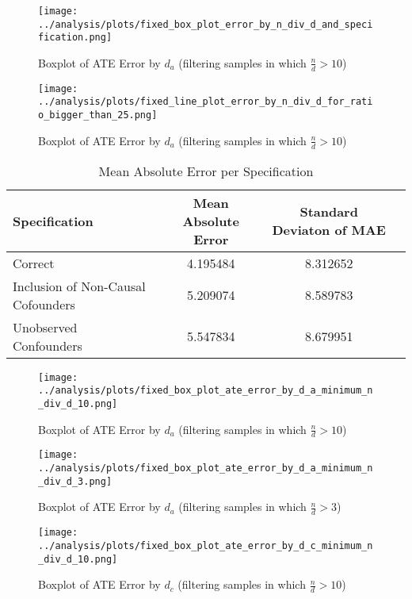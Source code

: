 \documentclass{article}
\numberwithin{equation}{section}
\begin{document}
\begin{figure}[H]
    \centering
    \texttt{[image: ../analysis/plots/fixed\_box\_plot\_error\_by\_n\_div\_d\_and\_specification.png]}
    \caption{Boxplot of ATE Error by $d_a$ (filtering samples in which $\frac{n}{d} > 10$)}
\end{figure}

\begin{figure}[H]
    \centering
    \texttt{[image: ../analysis/plots/fixed\_line\_plot\_error\_by\_n\_div\_d\_for\_ratio\_bigger\_than\_25.png]}
    \caption{Boxplot of ATE Error by $d_a$ (filtering samples in which $\frac{n}{d} > 10$)}
\end{figure}

\begin{table}[H]
    \centering
    \begin{tabular}{lccc}
        \toprule
        Specification & Mean Absolute Error & Standard Deviaton of MAE \\
        \midrule
        Correct & 4.195484 & 8.312652 \\
        Inclusion of Non-Causal Cofounders & 5.209074 & 8.589783 \\
        Unobserved Confounders & 5.547834 & 8.679951 \\
        \bottomrule
    \end{tabular}
    \caption{Mean Absolute Error per Specification}
\end{table}
    
\begin{figure}[H]
    \centering
    \texttt{[image: ../analysis/plots/fixed\_box\_plot\_ate\_error\_by\_d\_a\_minimum\_n\_div\_d\_10.png]}
    \caption{Boxplot of ATE Error by $d_a$ (filtering samples in which $\frac{n}{d} > 10$)}
\end{figure}

\begin{figure}[H]
    \centering
    \texttt{[image: ../analysis/plots/fixed\_box\_plot\_ate\_error\_by\_d\_a\_minimum\_n\_div\_d\_3.png]}
    \caption{Boxplot of ATE Error by $d_a$ (filtering samples in which $\frac{n}{d} > 3$)}
\end{figure}

\begin{figure}[H]
    \centering
    \texttt{[image: ../analysis/plots/fixed\_box\_plot\_ate\_error\_by\_d\_c\_minimum\_n\_div\_d\_10.png]}
    \caption{Boxplot of ATE Error by $d_c$ (filtering samples in which $\frac{n}{d} > 10$)}
\end{figure}
\end{document}
